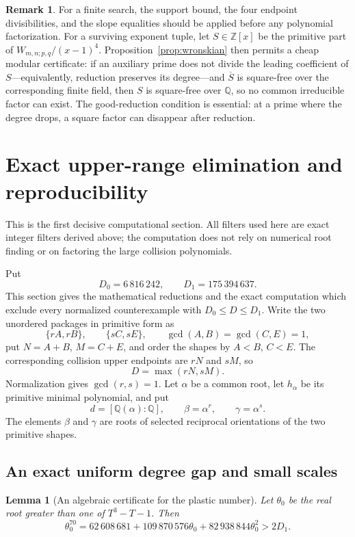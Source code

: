 \documentclass[11pt]{article}
\newtheorem{lemma}[theorem]{Lemma}
\theoremstyle{definition}
\newtheorem{remark}[theorem]{Remark}
\newcommand{\Q}{\mathbb Q}
\newcommand{\Z}{\mathbb Z}
\begin{document}
\begin{remark}
For a finite search, the support bound, the four endpoint divisibilities, and
the slope equalities should be applied before any polynomial factorization.
For a surviving exponent tuple, let \(S\in\Z[x]\) be the primitive part of
\(W_{m,n;p,q}/(x-1)^4\).  Proposition~\ref{prop:wronskian} then permits a
cheap modular certificate: if an auxiliary prime does not divide the leading
coefficient of \(S\)---equivalently, reduction preserves its degree---and
\(\overline S\) is square-free over the corresponding finite field, then
\(S\) is square-free over \(\Q\), so no common irreducible factor can exist.
The good-reduction condition is essential: at a prime where the degree drops,
a square factor can disappear after reduction.
\end{remark}


\section{Exact upper-range elimination and reproducibility}
\label{sec:computation}

This is the first decisive computational section.  All filters used here are exact integer filters derived above; the computation does not rely on numerical root finding or on factoring the large collision polynomials.

Put
\[
 D_0=6\,816\,242,
 \qquad
 D_1=175\,394\,637.
\]
This section gives the mathematical reductions and the exact computation
which exclude every normalized counterexample with \(D_0\leq D\leq D_1\).
Write the two unordered packages in primitive form as
\[
 \{rA,rB\},\qquad \{sC,sE\},
 \qquad
 \gcd(A,B)=\gcd(C,E)=1,
\]
put \(N=A+B\), \(M=C+E\), and order the shapes by \(A<B\), \(C<E\).
The corresponding collision upper endpoints are \(rN\) and \(sM\), so
\[
 D=\max(rN,sM).
\]
Normalization gives \(\gcd(r,s)=1\).  Let \(\alpha\) be a common root,
let \(h_\alpha\) be its primitive minimal polynomial, and put
\[
 d=[\Q(\alpha):\Q],\qquad
 \beta=\alpha^r,\qquad \gamma=\alpha^s.
\]
The elements \(\beta\) and \(\gamma\) are roots of selected reciprocal
orientations of the two primitive shapes.

\subsection{An exact uniform degree gap and small scales}

\begin{lemma}[An algebraic certificate for the plastic number]
\label{lem:plasticpower}
Let \(\theta_0\) be the real root greater than one of \(T^3-T-1\).  Then
\begin{equation}
 \theta_0^{70}
 =62\,608\,681+109\,870\,576\theta_0
   +82\,938\,844\theta_0^2
 >2D_1.
 \tag{18.1}
\end{equation}
\end{lemma}
\end{document}
